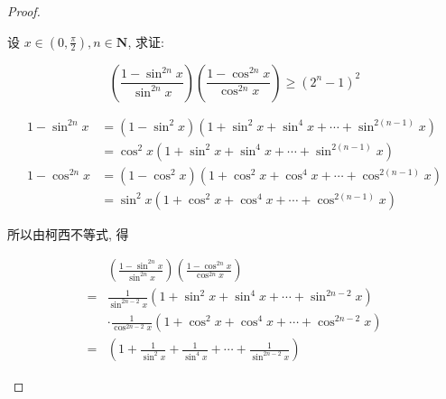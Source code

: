\begin{proof}
\begin{example}
	设 $x \in\left(0, \frac{\pi}{2}\right), n \in \mathbf{N}$, 求证:
	
	$$
	\left(\frac{1-\sin ^{2 n} x}{\sin ^{2 n} x}\right)\left(\frac{1-\cos ^{2 n} x}{\cos ^{2 n} x}\right) \geqslant\left(2^{n}-1\right)^{2}
	$$
	
	
	$$
	\begin{aligned}
	1-\sin ^{2 n} x & =\left(1-\sin ^{2} x\right)\left(1+\sin ^{2} x+\sin ^{4} x+\cdots+\sin ^{2(n-1)} x\right) \\
	& =\cos ^{2} x\left(1+\sin ^{2} x+\sin ^{4} x+\cdots+\sin ^{2(n-1)} x\right) \\
	1-\cos ^{2 n} x & =\left(1-\cos ^{2} x\right)\left(1+\cos ^{2} x+\cos ^{4} x+\cdots+\cos ^{2(n-1)} x\right) \\
	& =\sin ^{2} x\left(1+\cos ^{2} x+\cos ^{4} x+\cdots+\cos ^{2(n-1)} x\right)
	\end{aligned}
	$$
	
	所以由柯西不等式, 得
	
	$$
	\begin{aligned}
	& \left(\frac{1-\sin ^{2 n} x}{\sin ^{2 n} x}\right)\left(\frac{1-\cos ^{2 n} x}{\cos ^{2 n} x}\right) \\
	= & \frac{1}{\sin ^{2 n-2} x}\left(1+\sin ^{2} x+\sin ^{4} x+\cdots+\sin ^{2 n-2} x\right) \\
	& \cdot \frac{1}{\cos ^{2 n-2} x}\left(1+\cos ^{2} x+\cos ^{4} x+\cdots+\cos ^{2 n-2} x\right) \\
	= & \left(1+\frac{1}{\sin ^{2} x}+\frac{1}{\sin ^{4} x}+\cdots+\frac{1}{\sin ^{2 n-2} x}\right)
	\end{aligned}
	$$
	

\end{example}
\end{proof}
